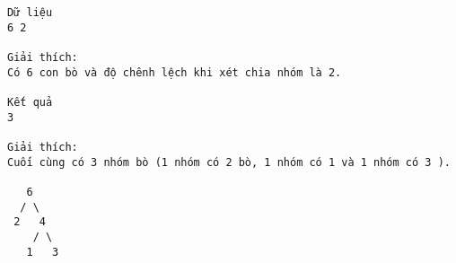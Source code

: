\begin{verbatim}
Dữ liệu
6 2

Giải thích:
Có 6 con bò và độ chênh lệch khi xét chia nhóm là 2.

Kết quả
3

Giải thích:
Cuối cùng có 3 nhóm bò (1 nhóm có 2 bò, 1 nhóm có 1 và 1 nhóm có 3 ).

   6
  / \
 2   4
    / \
   1   3
\end{verbatim}